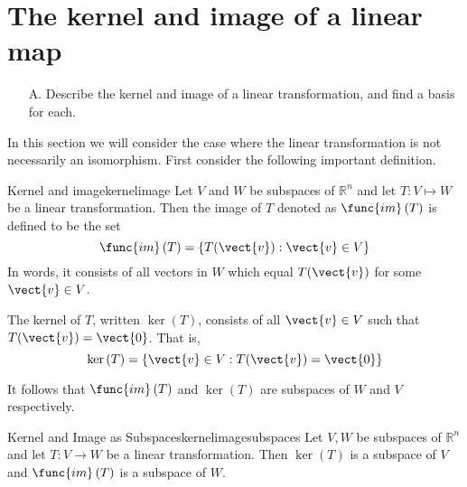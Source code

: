 \section{The kernel and image of a linear map}

\begin{outcome}
\begin{enumerate}
\item[A.]  Describe the kernel and image of a linear transformation, and find a basis for each. 
\end{enumerate}
\end{outcome}

In this section we will consider the case where the linear transformation is not necessarily an
isomorphism. First consider the following important definition.

\begin{definition}{Kernel and image}{kernelimage}
Let $V$ and $W$ be subspaces of $\mathbb{R}^n$ and let $T:V\mapsto W$ be a linear transformation. Then the image of $T$
denoted as $\func{im}\left( T\right) $ is defined to be the set 
\begin{equation*}
\func{im}\left( T\right) = \left\{T (\vect{v}):\vect{v}\in V\right\}
\end{equation*}
In words, it consists of all vectors in $W$ which equal $T(\vect{v})$ for some $
\vect{v}\in V$.

The kernel of $T$, written $\ker \left( T\right) $, consists of all $\vect{v}\in V$ such that $T(\vect{v})=\vect{0}$. That is, 
\begin{equation*}
\ker \left( T\right) =\left\{ \vect{v}\in V:T(\vect{v})=\vect{0}\right\}
\end{equation*}
\end{definition}

It follows that $\func{im}\left( T\right) $ and $\ker \left( T\right) $
are subspaces of $W$ and $V$ respectively.

\begin{proposition}{Kernel and Image as Subspaces}{kernelimagesubspaces}
Let $V, W$ be subspaces of $\mathbb{R}^n$ and let $T:V\rightarrow W$ be a linear transformation. Then $\ker \left(
T\right) $ is a subspace of $V$ and $\func{im}\left( T\right) $ is a
subspace of $W$.
\end{proposition}

